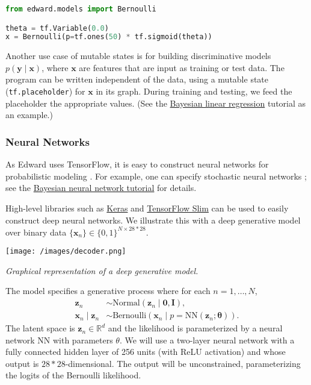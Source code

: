 \begin{lstlisting}[language=python]
from edward.models import Bernoulli

theta = tf.Variable(0.0)
x = Bernoulli(p=tf.ones(50) * tf.sigmoid(theta))
\end{lstlisting}

Another use case of mutable states is for building discriminative
models $p(\mathbf{y}\mid\mathbf{x})$, where $\mathbf{x}$ are features
that are input as training or test data. The program can be written
independent of the data, using a mutable state
(\texttt{tf.placeholder}) for $\mathbf{x}$ in its graph. During
training and testing, we feed the placeholder the appropriate values.
(See the
\href{/tutorials/supervised-regression}{Bayesian linear
regression} tutorial as an example.)

\subsubsection{Neural Networks}

As Edward uses TensorFlow, it is easy to construct neural networks for
probabilistic modeling \citep{rumelhart1988parallel}.
For example, one can specify stochastic neural networks
\citep{neal1990learning}; see the
\href{/tutorials/bayesian-neural-network}{Bayesian neural network tutorial}
for details.

High-level libraries such as
\href{http://keras.io}{Keras} and
\href{https://github.com/tensorflow/tensorflow/tree/master/tensorflow/contrib/slim}{TensorFlow Slim}
can be used to easily construct deep neural networks.
We illustrate this with a deep generative model over binary data
$\{\mathbf{x}_n\}\in\{0,1\}^{N\times 28*28}$.

\texttt{[image: /images/decoder.png]}

{\small\textit{Graphical representation of a deep generative model.}}

The model specifies a generative process where for each
$n=1,\ldots,N$,
%
\begin{align*}
\mathbf{z}_n &\sim \text{Normal}(\mathbf{z}_n \mid \mathbf{0}, \mathbf{I}), \\[1.5ex]
\mathbf{x}_n\mid \mathbf{z}_n &\sim \text{Bernoulli}(\mathbf{x}_n\mid
p=\mathrm{NN}(\mathbf{z}_n; \mathbf{\theta})).
\end{align*}
%
The latent space is $\mathbf{z}_n\in\mathbb{R}^d$ and the
likelihood is parameterized by a neural network $\mathrm{NN}$ with
parameters $\theta$. We will use a two-layer neural network with a
fully connected hidden layer of 256 units (with ReLU activation) and
whose output is $28*28$-dimensional. The output will be unconstrained,
parameterizing the logits of the Bernoulli likelihood.

